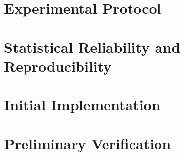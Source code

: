 \documentclass[11pt,a4paper]{article}
\begin{document}
\section{Experimental Protocol}


\section{Statistical Reliability and Reproducibility}


\section{Initial Implementation}


\section{Preliminary Verification}




\end{document}
